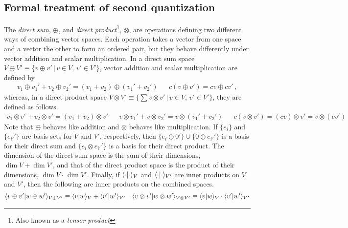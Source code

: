 \documentclass[11pt]{article}
\numberwithin{equation}{section}
\begin{document}
\subsection{Formal treatment of second quantization}

\begin{dfn}\label{dfn:direct-sum-and-direct-product}
\begin{samepage}
The \textit{direct sum}, $\oplus$, and \textit{direct product}\footnote{Also known as a \textit{tensor product}}, $\otimes$, are operations defining two different ways of combining vector spaces.
Each operation takes a vector from one space and a vector the other to form an ordered pair, but they behave differently under vector addition and scalar multiplication.
In a direct sum space $V\oplus V'\equiv\{v\oplus v'\,|\,v\in V,\,v'\in V'\}$,
vector addition and scalar multiplication are defined by
\begin{align}
  v_1\oplus v_1'
+
  v_2\oplus v_2'
=
  (v_1 + v_2)
\oplus
  (v_1' + v_2')
&&
  c(v\oplus v')
=
  cv\oplus cv'\,,
\end{align}
whereas, in a direct product space $V\otimes V'\equiv\{\sum v\otimes v'\,|\,v\in V,\,v'\in V'\}$, they are defined as follows.
\begin{align}
  v_1\otimes v'
+
  v_2\otimes v'
=
  (v_1 + v_2)\otimes v'
&&
  v\otimes v_1'
+
  v\otimes v_2'
=
  v\otimes(v_1' + v_2')
&&
  c(v\otimes v')
=
  (cv)\otimes v'
=
  v\otimes(cv')
\end{align}
Note that $\oplus$ behaves like addition and $\otimes$ behaves like multiplication.
If $\{e_i\}$ and $\{e_{i'}'\}$ are basis sets for $V$ and $V'$, respectively, then $\{e_i\oplus0'\}\cup\{0\oplus e_{i'}'\}$ is a basis for their direct sum and $\{e_i\otimes e_{i'}'\}$ is a basis for their direct product.
The dimension of the direct sum space is the sum of their dimensions,
$\dim V+\dim V'$,
and that of the direct product space is the product of their dimensions,
$\dim V\cdot \,\dim V'$.
Finally, if $\langle\cdot|\cdot\rangle_V$ and $\langle\cdot|\cdot\rangle_{V'}$ are inner products on $V$ and $V'$, then the following are inner products on the combined spaces.
\begin{align}
  \langle v\oplus v'|w\oplus w'\rangle_{V\oplus V'}
\equiv
  \langle v|w\rangle_V
+
  \langle v'|w'\rangle_{V'}
&&
  \langle v\otimes v'|w\otimes w'\rangle_{V\otimes V'}
\equiv
  \langle v|w\rangle_V
\cdot
  \langle v'|w'\rangle_{V'}
\end{align}
\end{samepage}
\end{dfn}
\end{document}
